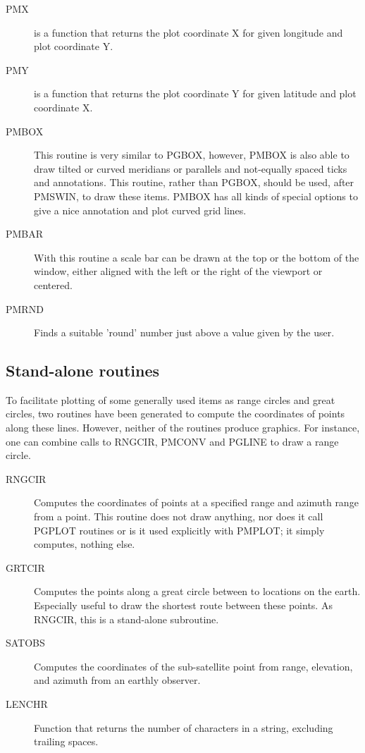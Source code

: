 \documentclass[titlepage,a4paper]{article}
\begin{document}
\begin{description}
\item[PMX]
is a function that returns the plot coordinate X for given longitude and
plot coordinate Y.

\item[PMY]
is a function that returns the plot coordinate Y for given latitude and
plot coordinate X.

\item[PMBOX]
This routine is very similar to PGBOX, however, PMBOX is also able to draw
tilted or curved meridians or parallels and not-equally spaced ticks and
annotations. This routine, rather than PGBOX, should be used, after PMSWIN,
to draw these items. PMBOX has all kinds of special options to give a
nice annotation and plot curved grid lines.

\item[PMBAR]
With this routine a scale bar can be drawn at the top or the bottom of the
window, either aligned with the left or the right of the viewport or centered.

\item[PMRND]
Finds a suitable 'round' number just above a value given by the user.
\end{description}

\subsection{Stand-alone routines}
To facilitate plotting of some generally used items as range circles and
great circles, two routines have been generated to compute the coordinates
of points along these lines. However, neither of the routines produce
graphics. For instance, one can combine calls to RNGCIR, PMCONV and PGLINE
to draw a range circle.

\begin{description}
\item[RNGCIR]
Computes the coordinates of points at a specified range and azimuth range from
a point. This routine does not draw anything, nor does it call PGPLOT routines
or is it used explicitly with PMPLOT; it simply computes, nothing else.

\item[GRTCIR]
Computes the points along a great circle between to locations on the earth.
Especially useful to draw the shortest route between these points. As RNGCIR,
this is a stand-alone subroutine.

\item[SATOBS]
Computes the coordinates of the sub-satellite point from range,
elevation, and azimuth from an earthly observer.

\item[LENCHR]
Function that returns the number of characters in a string, excluding
trailing spaces.
\end{description}
\end{document}
